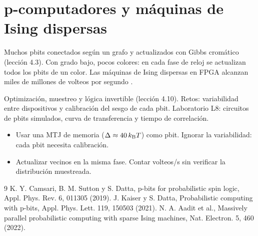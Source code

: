 \documentclass[11pt,a4paper]{article}
\begin{document}
\section{p-computadores y máquinas de Ising dispersas}
Muchos pbits conectados según un grafo y actualizados con Gibbs cromático (lección 4.3). Con grado bajo, pocos colores: en cada fase de reloj se actualizan
todos los pbits de un color. Las máquinas de Ising dispersas en FPGA alcanzan miles de millones de volteos por segundo \cite{aadit}.

\begin{aplicacion}
Optimización, muestreo y lógica invertible (lección 4.10). Retos: variabilidad entre dispositivos y calibración del sesgo de cada pbit. Laboratorio L8:
circuitos de pbits simulados, curva de transferencia y tiempo de correlación.
\end{aplicacion}

\begin{error}
\begin{itemize}[nosep]
\item Usar una MTJ de memoria ($\Delta\approx40\,k_{\mathrm B} T$) como pbit. \quad Ignorar la variabilidad: cada pbit necesita calibración.
\item Actualizar vecinos en la misma fase. \quad Contar volteos/s sin verificar la distribución muestreada.
\end{itemize}
\end{error}

\begin{thebibliography}{9}\small
{} K. Y. Camsari, B. M. Sutton y S. Datta, p-bits for probabilistic spin logic, Appl. Phys. Rev. 6, 011305 (2019).
 J. Kaiser y S. Datta, Probabilistic computing with p-bits, Appl. Phys. Lett. 119, 150503 (2021).
 N. A. Aadit et al., Massively parallel probabilistic computing with sparse Ising machines, Nat. Electron. 5, 460 (2022).
\end{thebibliography}
\end{document}
